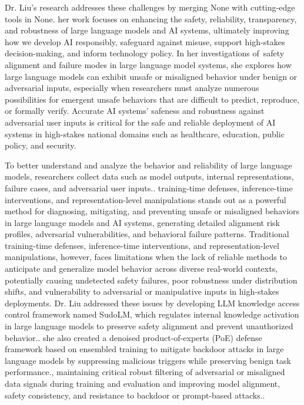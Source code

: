 \documentclass{article}
\begin{document}
Dr. Liu's research addresses these challenges by merging None with cutting-edge tools in None. her work focuses on enhancing the safety, reliability, transparency, and robustness of large language models and AI systems, ultimately improving how we develop AI responsibly, safeguard against misuse, support high-stakes decision-making, and inform technology policy. In her investigations of  safety alignment and failure modes in large language model systems, she explores how large language models can exhibit unsafe or misaligned behavior under benign or adversarial inputs, especially when researchers must analyze numerous possibilities for emergent unsafe behaviors that are difficult to predict, reproduce, or formally verify. Accurate AI systems' safeness and robustness against adversarial user inputs is critical for the safe and reliable deployment of AI systems in high-stakes national domains such as healthcare, education, public policy, and security.

To better understand and analyze the behavior and reliability of large language models, researchers collect data such as model outputs, internal representations, failure cases, and adversarial user inputs.. training-time defenses, inference-time interventions, and representation-level manipulations stands out as a powerful method for diagnosing, mitigating, and preventing unsafe or misaligned behaviors in large language models and AI systems, generating detailed alignment risk profiles, adversarial vulnerabilities, and behavioral failure patterns. Traditional training-time defenses, inference-time interventions, and representation-level manipulations, however, faces limitations when the lack of reliable methods to anticipate and generalize model behavior across diverse real-world contexts, potentially causing undetected safety failures, poor robustness under distribution shifts, and vulnerability to adversarial or manipulative inputs in high-stakes deployments. Dr. Liu addressed these issues by developing LLM knowledge access control framework named SudoLM, which regulates internal knowledge activation in large language models to preserve safety alignment and prevent unauthorized behavior.. she also created a denoised product-of-experts (PoE) defense framework based on ensembled training to mitigate backdoor attacks in large language models by suppressing malicious triggers while preserving benign task performance., maintaining critical robust filtering of adversarial or misaligned data signals during training and evaluation and improving model alignment, safety consistency, and resistance to backdoor or prompt-based attacks..
\end{document}
